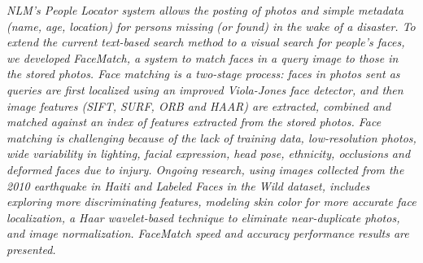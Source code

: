 
\begin{xpsectionbox}{}{}

\emph{\color{blue} NLM’s People Locator system allows the posting of photos and simple metadata (name, age, location) for persons missing (or found) in the wake of a disaster. To extend the current text-based search method to a visual search for people's faces, we developed FaceMatch, a system to match faces in a query image to those in the stored photos.
	Face matching is a two-stage process: faces in photos sent as queries are first localized using an improved Viola-Jones face detector, and then image features (SIFT, SURF, ORB and HAAR) are extracted, combined and matched against an index of features extracted from the stored photos. 
Face matching is challenging because of the lack of training data, low-resolution photos, wide variability in lighting, facial expression, head pose, ethnicity, occlusions and deformed faces due to injury.
	Ongoing research, using images collected from the 2010 earthquake in Haiti and Labeled Faces in the Wild dataset, includes exploring more discriminating features, modeling skin color for more accurate face localization, a Haar wavelet-based technique to eliminate near-duplicate photos, and image normalization. FaceMatch speed and accuracy performance results are presented.}

\end{xpsectionbox}

